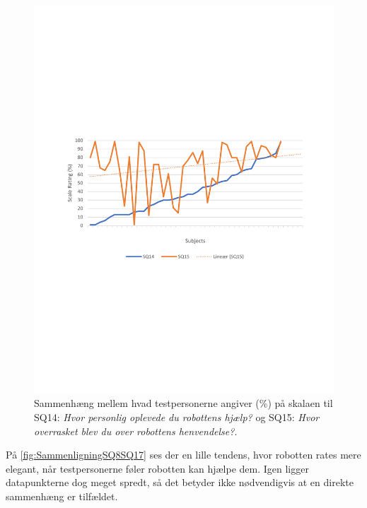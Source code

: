 \begin{figure}[H]
	\centering
	\includegraphics[width=\textwidth]{Figure/Korrelationsgrafer/SQ14+SQ15}
	\caption{Sammenhæng mellem hvad testpersonerne angiver (\%) på skalaen til SQ14: \textit{Hvor personlig oplevede du robottens hjælp?} og SQ15: \textit{Hvor overrasket blev du over robottens henvendelse?}.}
	\label{fig:SammenligningSQ14SQ15}
\end{figure}
\noindent
%
På \autoref{fig:SammenligningSQ8SQ17} ses der en lille tendens, hvor robotten rates mere elegant, når testpersonerne føler robotten kan hjælpe dem. Igen ligger datapunkterne dog meget spredt, så det betyder ikke nødvendigvis at en direkte sammenhæng er tilfældet. 
%
